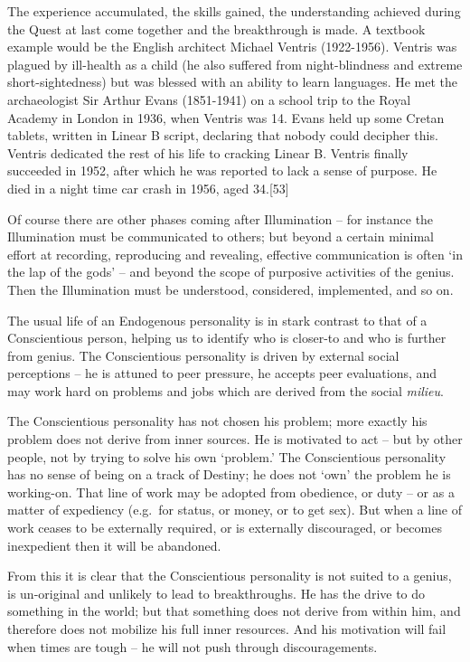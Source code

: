 \documentclass[
]{book}
\begin{document}
The experience accumulated, the skills gained, the understanding achieved during the Quest at last come together and the breakthrough is made. A textbook example would be the English architect Michael Ventris (1922-1956). Ventris was plagued by ill-health as a child (he also suffered from night-blindness and extreme short-sightedness) but was blessed with an ability to learn languages. He met the archaeologist Sir Arthur Evans (1851-1941) on a school trip to the Royal Academy in London in 1936, when Ventris was 14. Evans held up some Cretan tablets, written in Linear B script, declaring that nobody could decipher this. Ventris dedicated the rest of his life to cracking Linear B. Ventris finally succeeded in 1952, after which he was reported to lack a sense of purpose. He died in a night time car crash in 1956, aged 34.{[}53{]}

Of course there are other phases coming after Illumination -- for instance the Illumination must be communicated to others; but beyond a certain minimal effort at recording, reproducing and revealing, effective communication is often `in the lap of the gods' -- and beyond the scope of purposive activities of the genius. Then the Illumination must be understood, considered, implemented, and so on.

The usual life of an Endogenous personality is in stark contrast to that of a Conscientious person, helping us to identify who is closer-to and who is further from genius. The Conscientious personality is driven by external social perceptions -- he is attuned to peer pressure, he accepts peer evaluations, and may work hard on problems and jobs which are derived from the social \emph{milieu}.

The Conscientious personality has not chosen his problem; more exactly his problem does not derive from inner sources. He is motivated to act -- but by other people, not by trying to solve his own `problem.' The Conscientious personality has no sense of being on a track of Destiny; he does not `own' the problem he is working-on. That line of work may be adopted from obedience, or duty -- or as a matter of expediency (e.g.~for status, or money, or to get sex). But when a line of work ceases to be externally required, or is externally discouraged, or becomes inexpedient then it will be abandoned.

From this it is clear that the Conscientious personality is not suited to a genius, is un-original and unlikely to lead to breakthroughs. He has the drive to do something in the world; but that something does not derive from within him, and therefore does not mobilize his full inner resources. And his motivation will fail when times are tough -- he will not push through discouragements.
\end{document}
